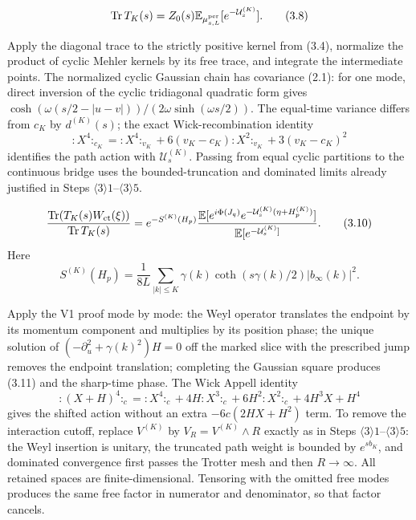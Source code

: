 \documentclass[11pt,a4paper]{article}
\newcommand{\U}{\mathcal U}
\newcommand{\Tr}{\operatorname{Tr}}
\DeclareMathOperator{\cth}{coth}
\begin{document}
\[
 \Tr T_K(s)=Z_0(s)\E_{\mu^{\rm per}_{s,L}}[e^{-\U_s^{(K)}}].
\tag{3.8}
\]

\Because Apply the diagonal trace to the strictly positive kernel from (3.4),
normalize the product of cyclic Mehler kernels by its free trace, and integrate the
intermediate points.  The normalized cyclic Gaussian chain has covariance (2.1):
for one mode, direct inversion of the cyclic tridiagonal quadratic form gives
$\cosh(\omega(s/2-|u-v|))/(2\omega\sinh(\omega s/2))$.  The equal-time
variance differs from $c_K$ by $d^{(K)}(s)$; the exact Wick-recombination identity
\[
 {:}X^4{:}_{c_K}={:}X^4{:}_{v_K}
 +6(v_K-c_K){:}X^2{:}_{v_K}+3(v_K-c_K)^2
\tag{3.9}
\]
identifies the path action with $\U_s^{(K)}$.  Passing from equal cyclic
partitions to the continuous bridge uses the bounded-truncation and dominated
limits already justified in Steps $\langle3\rangle1$--$\langle3\rangle5$.

\[
 \frac{\Tr(T_K(s)W_{\rm ct}(\xi))}{\Tr T_K(s)}
 =e^{-S^{(K)}(H_p)}
 \frac{\E[e^{i\Phi(J_q)}e^{-\U_s^{(K)}(\eta+H_p^{(K)})}]}
 {\E[e^{-\U_s^{(K)}]}}.
\tag{3.10}
\]
Here
\[
 S^{(K)}(H_p)=\frac1{8L}\sum_{|k|\le K}
 \gamma(k)\cth(s\gamma(k)/2)|b_\infty(k)|^2.
\tag{3.11}
\]

\Because Apply the V1 proof mode by mode: the Weyl operator translates the endpoint
by its momentum component and multiplies by its position phase; the unique solution
of $(-\partial_u^2+\gamma(k)^2)H=0$ off the marked slice with the prescribed jump
removes the endpoint translation; completing the Gaussian square produces (3.11)
and the sharp-time phase.  The Wick Appell identity
\[
 {:}(X+H)^4{:}_c
 ={:}X^4{:}_c+4H{:}X^3{:}_c+6H^2{:}X^2{:}_c+4H^3X+H^4
\tag{3.12}
\]
gives the shifted action without an extra $-6c(2HX+H^2)$ term.  To remove the
interaction cutoff, replace $V^{(K)}$ by $V_R=V^{(K)}\wedge R$ exactly as in
Steps $\langle3\rangle1$--$\langle3\rangle5$: the Weyl insertion is unitary, the
truncated path weight is bounded by $e^{sb_K}$, and dominated convergence first
passes the Trotter mesh and then $R\to\infty$.  All retained spaces are
finite-dimensional.  Tensoring with the omitted free modes produces the same free
factor in numerator and denominator, so that factor cancels.

\end{document}
